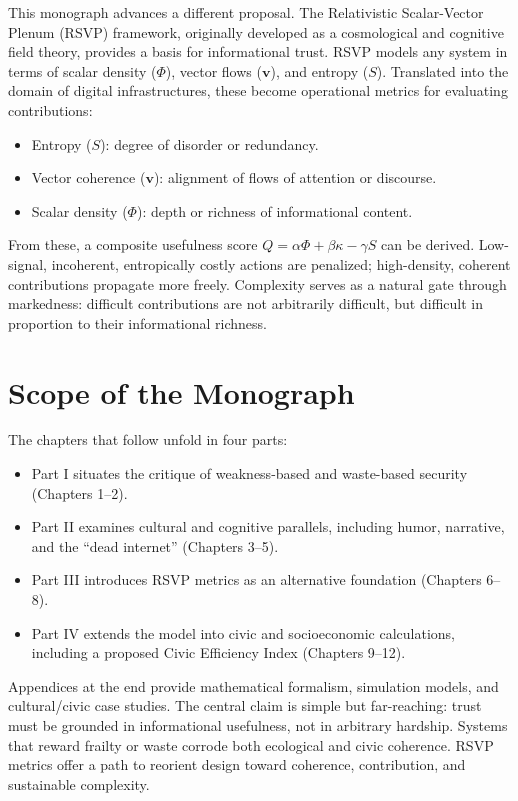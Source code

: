 \documentclass[openany]{book}
\begin{document}
This monograph advances a different proposal. The Relativistic Scalar-Vector Plenum (RSVP) framework, originally developed as a cosmological and cognitive field theory, provides a basis for informational trust. RSVP models any system in terms of scalar density ($\Phi$), vector flows ($\mathbf{v}$), and entropy ($S$). Translated into the domain of digital infrastructures, these become operational metrics for evaluating contributions:

\begin{itemize}
    \item Entropy ($S$): degree of disorder or redundancy.
    \item Vector coherence ($\mathbf{v}$): alignment of flows of attention or discourse.
    \item Scalar density ($\Phi$): depth or richness of informational content.
\end{itemize}

From these, a composite usefulness score $Q = \alpha \Phi + \beta \kappa - \gamma S$ can be derived. Low-signal, incoherent, entropically costly actions are penalized; high-density, coherent contributions propagate more freely. Complexity serves as a natural gate through markedness: difficult contributions are not arbitrarily difficult, but difficult in proportion to their informational richness.

\section{Scope of the Monograph}

The chapters that follow unfold in four parts:

\begin{itemize}
    \item Part I situates the critique of weakness-based and waste-based security (Chapters 1--2).
    \item Part II examines cultural and cognitive parallels, including humor, narrative, and the ``dead internet'' (Chapters 3--5).
    \item Part III introduces RSVP metrics as an alternative foundation (Chapters 6--8).
    \item Part IV extends the model into civic and socioeconomic calculations, including a proposed Civic Efficiency Index (Chapters 9--12).
\end{itemize}

Appendices at the end provide mathematical formalism, simulation models, and cultural/civic case studies. The central claim is simple but far-reaching: trust must be grounded in informational usefulness, not in arbitrary hardship. Systems that reward frailty or waste corrode both ecological and civic coherence. RSVP metrics offer a path to reorient design toward coherence, contribution, and sustainable complexity.
\end{document}
